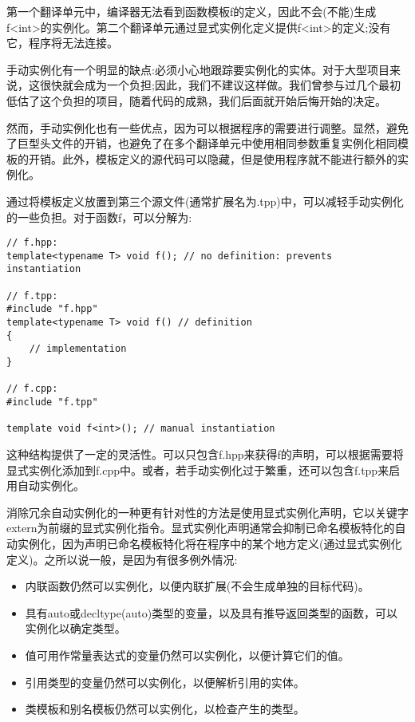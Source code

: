 第一个翻译单元中，编译器无法看到函数模板f的定义，因此不会(不能)生成f<int>的实例化。第二个翻译单元通过显式实例化定义提供f<int>的定义;没有它，程序将无法连接。

手动实例化有一个明显的缺点:必须小心地跟踪要实例化的实体。对于大型项目来说，这很快就会成为一个负担;因此，我们不建议这样做。我们曾参与过几个最初低估了这个负担的项目，随着代码的成熟，我们后面就开始后悔开始的决定。

然而，手动实例化也有一些优点，因为可以根据程序的需要进行调整。显然，避免了巨型头文件的开销，也避免了在多个翻译单元中使用相同参数重复实例化相同模板的开销。此外，模板定义的源代码可以隐藏，但是使用程序就不能进行额外的实例化。

通过将模板定义放置到第三个源文件(通常扩展名为.tpp)中，可以减轻手动实例化的一些负担。对于函数f，可以分解为:

\begin{lstlisting}[style=styleCXX]
// f.hpp:
template<typename T> void f(); // no definition: prevents instantiation

// f.tpp:
#include "f.hpp"
template<typename T> void f() // definition
{
	// implementation
}

// f.cpp:
#include "f.tpp"

template void f<int>(); // manual instantiation
\end{lstlisting}

这种结构提供了一定的灵活性。可以只包含f.hpp来获得f的声明，可以根据需要将显式实例化添加到f.cpp中。或者，若手动实例化过于繁重，还可以包含f.tpp来启用自动实例化。


消除冗余自动实例化的一种更有针对性的方法是使用显式实例化声明，它以关键字extern为前缀的显式实例化指令。显式实例化声明通常会抑制已命名模板特化的自动实例化，因为声明已命名模板特化将在程序中的某个地方定义(通过显式实例化定义)。之所以说一般，是因为有很多例外情况:

\begin{itemize}
\item 
内联函数仍然可以实例化，以便内联扩展(不会生成单独的目标代码)。

\item 
具有auto或decltype(auto)类型的变量，以及具有推导返回类型的函数，可以实例化以确定类型。

\item 
值可用作常量表达式的变量仍然可以实例化，以便计算它们的值。

\item 
引用类型的变量仍然可以实例化，以便解析引用的实体。

\item 
类模板和别名模板仍然可以实例化，以检查产生的类型。
\end{itemize}


